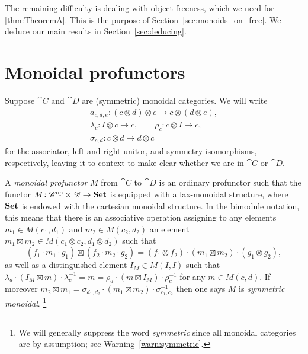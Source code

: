 \documentclass[11pt,oneside,article]{memoir}
\begin{document}
The remaining difficulty is dealing with object-freeness, which we need for \ref{thm:TheoremA}. This is the purpose of Section~\ref{sec:monoids_on_free}. We deduce our main results in Section~\ref{sec:deducing}.


\section{Monoidal profunctors}\label{sec:monoidal_profunctors}

Suppose $\cat{C}$ and $\cat{D}$ are (symmetric) monoidal categories. We will write
\begin{gather*}
   a_{c,d,e}\colon (c\otimes d)\otimes e \to c\otimes(d\otimes e), \\
      \lambda_c\colon I\otimes c\to c,
      \qquad \rho_c\colon c\otimes I \to c, \\
      \sigma_{c,d}\colon c\otimes d\to d\otimes c
\end{gather*}
for the associator, left and right unitor, and symmetry isomorphisms, respectively, leaving it to
context to make clear whether we are in $\cat{C}$ or $\cat{D}$.

A \emph{monoidal profunctor} $M$ from $\cat{C}$ to $\cat{D}$ is an ordinary profunctor such that the
functor $M\colon {\mathscr{C}}^{\text{op}}\times\mathscr{D}\to\mathbf{Set}$ is equipped with a lax-monoidal structure, where $\mathbf{Set}$ is endowed with
the cartesian monoidal structure. In the bimodule notation, this means that there is an
associative operation assigning to any elements $m_1\in M(c_1,d_1)$ and $m_2\in M(c_2,d_2)$ an
element $m_1\boxtimes m_2\in M(c_1\otimes c_2,d_1\otimes d_2)$ such that
\[
   (f_1\cdot m_1\cdot g_1)\boxtimes(f_2\cdot m_2\cdot g_2) = (f_1\otimes f_2)\cdot(m_1\boxtimes m_2)\cdot(g_1\otimes g_2),
\]
as well as a distinguished element $I_M\in M(I,I)$ such that $\lambda_d\cdot(I_M\boxtimes
m)\cdot\lambda^{-1}_c = m = \rho_d\cdot(m\boxtimes I_M)\cdot\rho^{-1}_c$ for any $m\in M(c,d)$. If
moreover $m_2\boxtimes m_1 = \sigma_{d_1,d_2}\cdot(m_1\boxtimes m_2)\cdot\sigma_{c_1,c_2}^{-1}$ then
one says $M$ is \emph{symmetric monoidal}.%
\footnote{We will generally suppress the word \emph{symmetric} since all monoidal categories are by assumption; see Warning~\ref{warn:symmetric}.}
\end{document}
